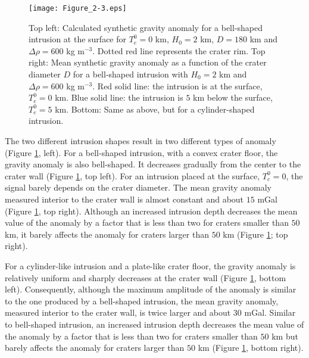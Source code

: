 \begin{figure}[h!]
  \begin{center}
    \graphicspath{ {/Users/thorey/Documents/These/Projet/FFC/Gravi_GRAIL/Article/Papier/Proof/} }
    \texttt{[image: Figure\_2-3.eps]}
    \caption{Top  left: Calculated  synthetic  gravity  anomaly for  a
      bell-shaped  intrusion  at  the  surface for  $T_e^0  =  0$  km,
      $H_0 = 2$ km, $D = 180$  km and $\Delta \rho = 600$ kg m$^{-3}$.
      Dotted  red line  represents the  crater rim.   Top right:  Mean
      synthetic gravity anomaly  as a function of  the crater diameter
      $D$  for  a  bell-shaped  intrusion   with  $H_0  =  2$  km  and
      $\Delta \rho = 600$ kg  m$^{-3}$.  Red solid line: the intrusion
      is  at  the  surface,  $T_e^0  =0$ km.   Blue  solid  line:  the
      intrusion is $5$ km below the  surface, $T_e^0 = 5$ km.  Bottom:
      Same as above, but for a cylinder-shaped intrusion.}
    \label{Figure2-3}
  \end{center}
\end{figure}

The two  different intrusion shapes  result in two different  types of
anomaly (Figure \ref{Figure2-3}, left).   For a bell-shaped intrusion,
with a convex  crater floor, the gravity anomaly  is also bell-shaped.
It  decreases gradually  from the  center to  the crater  wall (Figure
\ref{Figure2-3}, top left).   For an intrusion placed  at the surface,
$T_e^0 =0$,  the signal  barely depends on  the crater  diameter.  The
mean gravity  anomaly measured interior  to the crater wall  is almost
constant  and about  $15$  mGal (Figure  \ref{Figure2-3}, top  right).
Although an increased intrusion depth  decreases the mean value of the
anomaly by  a factor that  is less than  two for craters  smaller than
$50$ km, it barely affects the anomaly for craters larger than $50$ km
(Figure \ref{Figure2-3}; top right).

For  a cylinder-like  intrusion  and a  plate-like  crater floor,  the
gravity anomaly  is relatively  uniform and  sharply decreases  at the
crater  wall  (Figure  \ref{Figure2-3}, bottom  left).   Consequently,
although the  maximum amplitude of the  anomaly is similar to  the one
produced  by  a  bell-shaped  intrusion,  the  mean  gravity  anomaly,
measured interior to  the crater wall, is twice larger  and about $30$
mGal. Similar  to bell-shaped intrusion, an  increased intrusion depth
decreases the mean value of the anomaly  by a factor that is less than
two for  craters smaller than $50$  km but barely affects  the anomaly
for  craters  larger  than  $50$ km  (Figure  \ref{Figure2-3},  bottom
right).
  
